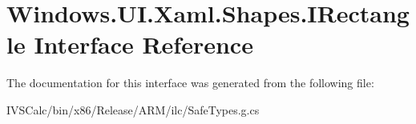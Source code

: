 \hypertarget{interface_windows_1_1_u_i_1_1_xaml_1_1_shapes_1_1_i_rectangle}{}\section{Windows.\+U\+I.\+Xaml.\+Shapes.\+I\+Rectangle Interface Reference}
\label{interface_windows_1_1_u_i_1_1_xaml_1_1_shapes_1_1_i_rectangle}


The documentation for this interface was generated from the following file\+:\begin{DoxyCompactItemize}
\item 
I\+V\+S\+Calc/bin/x86/\+Release/\+A\+R\+M/ilc/Safe\+Types.\+g.\+cs\end{DoxyCompactItemize}
